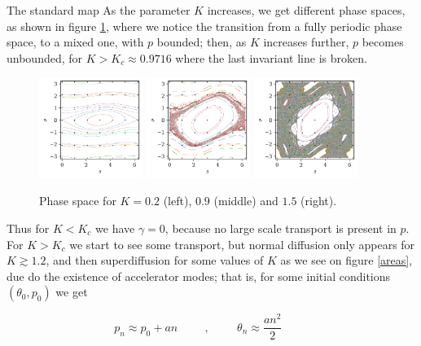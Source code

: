 \documentclass[final]{beamer}
\newlength{\colwidth}
\begin{document}
\begin{frame}[t]
\begin{columns}[t]
\begin{column}{\colwidth}
\begin{block}{The standard map}
  As the parameter $K$ increases, we get different phase spaces, as shown in figure \ref{pspace}, where we notice the transition from a fully periodic phase space, to a mixed one, with $p$ bounded; then, as $K$ increases further, $p$ becomes unbounded, for $K > K_c \approx 0.9716$ where the last invariant line is broken.

  \begin{figure}
    \includegraphics[width = 0.3\textwidth]{map_1_0.2000.png}
    \includegraphics[width = 0.3\textwidth]{map_1_0.9000.png}
    \includegraphics[width = 0.3\textwidth]{map_1_1.5000.png}
    \caption{Phase space for $K=0.2$ (left), $0.9$ (middle) and $1.5$ (right).}
    \label{pspace}
  \end{figure}

  Thus for $K < K_c$ we have $\gamma = 0$, because no large scale transport is present in $p$. For $K > K_c$ we start to see some transport, but normal diffusion only appears for $K \gtrsim 1.2$, and then superdiffusion for some values of $K$ as we see on figure \ref{areas}, due do the existence of accelerator modes; that is, for some initial conditions $(\theta_0,p_0)$ we get
  
  \begin{equation}
    p_{n} \approx p_0 + an \hspace{1cm},\hspace{1cm} \theta_{n} \approx \frac{an^2}{2} \hspace{1cm} 
  \end{equation}


\end{block}
\end{column}
\end{columns}
\end{frame}
\end{document}
